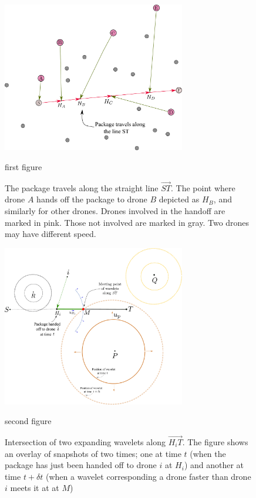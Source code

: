 \documentclass[10pt, english, oneside]{report}
\begin{document}
\begin{figure}
    \centering
    \begin{minipage}{0.45\textwidth}
        \centering
        \includegraphics[width=8cm]{docs/straight-line-pho-ex.pdf}
        \caption{first figure}
     \caption{The package travels along the straight line $\vec{ST}$. The point where drone $A$ hands off the 
              package to drone $B$ depicted as $H_B$, and similarly for other drones. Drones involved in the handoff 
              are marked in pink. Those not involved are marked in gray. Two drones may have different speed.}

    \end{minipage}\hfill
    \begin{minipage}{0.45\textwidth}
        \centering
        \includegraphics[width=8cm]{docs/circular_wavelets_intersect_along_st.pdf}
        \caption{second figure}
     \caption{Intersection of two expanding wavelets along $\vec{H_iT}$. The figure shows an overlay of  
              snapshots of two times; one at time $t$ (when the package has just been handed off to drone 
              $i$ at $H_i$) and another at time $t + \delta t$ (when a wavelet corresponding a drone faster 
              than drone $i$ meets it at at $M$)}
    \end{minipage}
\end{figure}
\label{fig:refalgoodw}
\end{document}

